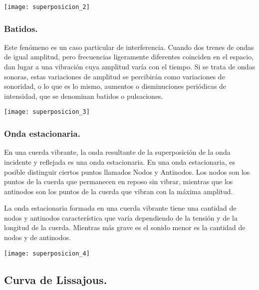 \documentclass[11pt]{article}
\newenvironment{Figuras}
  {\par\medskip\noindent\minipage{\linewidth}}
  {\endminipage\par\medskip}
\begin{document}
\begin{multicols}{2}
\begin{Figuras}
	\centering
    \texttt{[image: superposicion\_2]}
    \label{fig:mesh2}
\end{Figuras}

			\subsubsection{Batidos.}

Este fenómeno es un caso particular de interferencia. Cuando dos trenes de ondas de igual amplitud, pero frecuencias ligeramente diferentes coinciden en el espacio, dan lugar a una vibración cuya amplitud varía con el tiempo. Si se trata de ondas sonoras, estas variaciones de amplitud se percibirán como variaciones de sonoridad, o lo que es lo mismo, aumentos o disminuciones periódicas de intensidad, que se denominan batidos o pulsaciones.

\begin{Figuras}
	\centering
    \texttt{[image: superposicion\_3]}
    \label{fig:mesh3}
\end{Figuras}

			\subsubsection{Onda estacionaria.}

En una cuerda vibrante, la onda resultante de la superposición de la onda incidente y reflejada es una onda estacionaria. En una onda estacionaria, es posible distinguir ciertos puntos llamados Nodos y Antinodos. Los nodos son los puntos de la cuerda que permanecen en reposo sin vibrar, mientras que los antinodos son los puntos de la cuerda que vibran con la máxima amplitud.

La onda estacionaria formada en una cuerda vibrante tiene una cantidad de nodos y antinodos característica que varía dependiendo de la tensión y de la longitud de la cuerda. Mientras más grave es el sonido menor es la cantidad de nodos y de antinodos.

\begin{Figuras}
	\centering
    \texttt{[image: superposicion\_4]}
    \label{fig:mesh4}
\end{Figuras}

		\subsection{Curva de Lissajous.}


\end{multicols}
\end{document}
